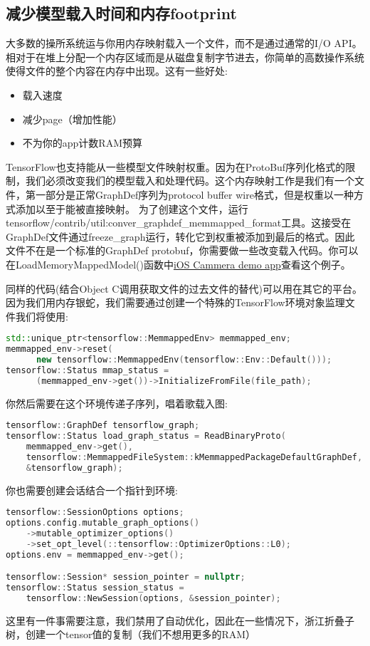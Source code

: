 \subsection{减少模型载入时间和内存footprint}
大多数的操所系统运与你用内存映射载入一个文件，而不是通过通常的I/O API。相对于在堆上分配一个内存区域而是从磁盘复制字节进去，你简单的高数操作系统使得文件的整个内容在内存中出现。这有一些好处:
\begin{itemize}
\item 载入速度
\item 减少page（增加性能）
\item 不为你的app计数RAM预算
\end{itemize}
TensorFlow也支持能从一些模型文件映射权重。因为在ProtoBuf序列化格式的限制，我们必须改变我们的模型载入和处理代码。这个内存映射工作是我们有一个文件，第一部分是正常GraphDef序列为protocol buffer wire格式，但是权重以一种方式添加以至于能被直接映射。
为了创建这个文件，运行tensorflow/contrib/util:conver\_graphdef\_memmapped\_format工具。这接受在GraphDef文件通过freeze\_graph运行，转化它到权重被添加到最后的格式。因此文件不在是一个标准的GraphDef protobuf，你需要做一些改变载入代码。你可以在LoadMemoryMappedModel()函数中\href{https://www.github.com/tensorflow/tensorflow/blob/r1.4/tensorflow/examples/ios/camera/tensorflow_utils.mm?l=147}{iOS Cammera demo app}查看这个例子。

同样的代码(结合Object C调用获取文件的过去文件的替代)可以用在其它的平台。因为我们用内存银蛇，我们需要通过创建一个特殊的TensorFlow环境对象监理文件我们将使用:
\begin{lstlisting}[language=C++]
std::unique_ptr<tensorflow::MemmappedEnv> memmapped_env;
memmapped_env->reset(
      new tensorflow::MemmappedEnv(tensorflow::Env::Default()));
tensorflow::Status mmap_status =
      (memmapped_env->get())->InitializeFromFile(file_path);
\end{lstlisting}
你然后需要在这个环境传递子序列，唱着歌载入图:
\begin{lstlisting}[language=C++]
tensorflow::GraphDef tensorflow_graph;
tensorflow::Status load_graph_status = ReadBinaryProto(
    memmapped_env->get(),
    tensorflow::MemmappedFileSystem::kMemmappedPackageDefaultGraphDef,
    &tensorflow_graph);
\end{lstlisting}
你也需要创建会话结合一个指针到环境:
\begin{lstlisting}[language=C++]
tensorflow::SessionOptions options;
options.config.mutable_graph_options()
    ->mutable_optimizer_options()
    ->set_opt_level(::tensorflow::OptimizerOptions::L0);
options.env = memmapped_env->get();

tensorflow::Session* session_pointer = nullptr;
tensorflow::Status session_status =
    tensorflow::NewSession(options, &session_pointer);

\end{lstlisting}
这里有一件事需要注意，我们禁用了自动优化，因此在一些情况下，浙江折叠子树，创建一个tensor值的复制（我们不想用更多的RAM）


